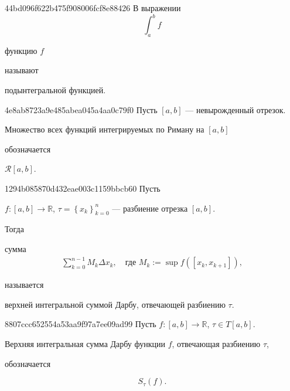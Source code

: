 \begin{note}{44bd096f622b475f908006fcf8e88426}
    В выражении
    \[
        \int_{a}^{b} f
    \]
    \begin{icloze}{2}функцию \( f \)\end{icloze} называют \begin{icloze}{1}подынтегральной функцией.\end{icloze}
\end{note}

\begin{note}{4e8ab8723a9e485abea045a4aa0c79f0}
    Пусть \({ [a, b] }\) --- невырожденный отрезок.
    \begin{icloze}{1}Множество всех функций интегрируемых по Риману на \( [a, b] \)\end{icloze} обозначается \begin{icloze}{2}\( \mathcal R[a, b] \).\end{icloze}
\end{note}

\begin{note}{1294b085870d432eae003c1159bbcb60}
    Пусть \begin{icloze}{3}\({ f : [a, b] \to \mathbb R }\),\: \({ \tau = \left\{ x_k \right\}_{k = 0}^{n} }\) --- разбиение отрезка \({ [a, b] }\).\end{icloze}
    Тогда \begin{icloze}{1}сумма
    \[
        \begin{gathered}
            \displaystyle \sum_{k=0}^{n - 1} M_k \Delta x_k, \quad \text{где \({ M_k := \sup f([x_k, x_{k + 1}]) }\)},
        \end{gathered}
    \]\end{icloze}
    называется \begin{icloze}{2}верхней интегральной суммой Дарбу, отвечающей разбиению \({ \tau }\).\end{icloze}
\end{note}

\begin{note}{8807ccc652554a53aa9f97a7ee09ad99}
    Пусть \({ f : [a, b] \to \mathbb R }\), \({ \tau \in T[a, b] }\).
    \begin{icloze}{1}Верхняя интегральная сумма Дарбу функции \({ f }\), отвечающая разбиению \({ \tau }\),\end{icloze} обозначается
    \begin{icloze}{2}
        \[
            S_\tau (f).
        \]
    \end{icloze}
\end{note}

